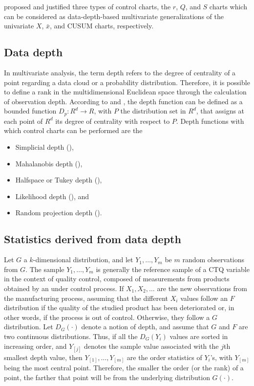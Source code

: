 \cite{liu1995control} proposed and justified three types of control charts, the $r$, $Q$, and $S$ charts which can be considered as data-depth-based multivariate generalizations of the univariate $X$, $\bar{x}$, and CUSUM charts, respectively.

\subsection{Data depth}
In multivariate analysis, the term depth refers to the degree of centrality of a point regarding a data cloud or a probability distribution. Therefore, it is possible to define a rank in the multidimensional Euclidean space through the calculation of observation depth. According to \cite{dyckerhoff2004data} and \citet{cascos2011data}, the depth function can be defined as a bounded function $D_{p}:R^{d} \longrightarrow R$, with $P$ the distribution set in $R^d$, that assigns at each point of $R^d$ its degree of centrality with respect to $P$. Depth functions with which control charts can be performed are the
\begin{itemize}
\item Simplicial depth (\citealt{liu1990notion}),
\item Mahalanobis depth (\citealt{mahalanobis1936generalised}),
\item Halfspace or Tukey depth (\citealt{tukey1975mathematics}),
\item Likelihood depth (\citealt{fraiman1997multivariate}), and
\item Random projection depth (\citealt{zuo2000general}).
\end{itemize}

\subsection{Statistics derived from data depth}
Let $G$ a $k$-dimensional distribution, and let $Y_1,\dots,Y_m$ be $m$ random observations from $G$. The sample $Y_1, \dots , Y_m$ is generally the reference sample of a CTQ variable in the context of quality control, composed of measurements from products obtained by an under control process. If $X_1, X_2, \dots$ are the new observations from the manufacturing process, assuming that the different $X_i$ values follow an $F$ distribution if the quality of the studied product has been deteriorated or, in other words, if the process is out of control. Otherwise, they follow a $G$ distribution. Let $D_G(\cdot)$ denote a notion of depth, and assume that $G$ and $F$ are two continuous distributions. Thus, if all the $D_G(Y_i)$ values are sorted in increasing order, and $Y_{[j]}$ denotes the sample value associated with the $j$th smallest depth value, then $Y_{\left[ 1\right]},\ldots,Y_{\left[ m\right]}$ are the order statistics of $Y_i$'s,
with $Y_{[m]}$ being the most central point. Therefore, the smaller the order (or
the rank) of a point, the farther that point will be from the underlying distribution  $G(\cdot)$.

